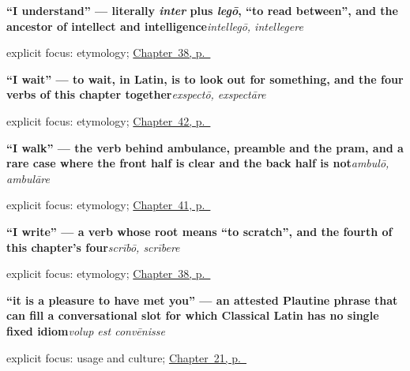 \noindent\begin{minipage}[t]{\linewidth}
\raggedright
\textbf{\textquotedblleft{}I understand\textquotedblright{} — literally \emph{inter} plus \emph{legō}, \textquotedblleft{}to read between\textquotedblright{}, and the ancestor of intellect and intelligence}\enspace\emph{intellegō, intellegere}\par
\footnotesize explicit focus: etymology; \hyperref[ch:la-mind-verbs]{Chapter~38, p.~\pageref*{ch:la-mind-verbs}}
\end{minipage}\par\smallskip

\noindent\begin{minipage}[t]{\linewidth}
\raggedright
\textbf{\textquotedblleft{}I wait\textquotedblright{} — to wait, in Latin, is to look out for something, and the four verbs of this chapter together}\enspace\emph{exspectō, exspectāre}\par
\footnotesize explicit focus: etymology; \hyperref[ch:la-getting-and-waiting-verbs]{Chapter~42, p.~\pageref*{ch:la-getting-and-waiting-verbs}}
\end{minipage}\par\smallskip

\noindent\begin{minipage}[t]{\linewidth}
\raggedright
\textbf{\textquotedblleft{}I walk\textquotedblright{} — the verb behind ambulance, preamble and the pram, and a rare case where the front half is clear and the back half is not}\enspace\emph{ambulō, ambulāre}\par
\footnotesize explicit focus: etymology; \hyperref[ch:la-motion-verbs]{Chapter~41, p.~\pageref*{ch:la-motion-verbs}}
\end{minipage}\par\smallskip

\noindent\begin{minipage}[t]{\linewidth}
\raggedright
\textbf{\textquotedblleft{}I write\textquotedblright{} — a verb whose root means \textquotedblleft{}to scratch\textquotedblright{}, and the fourth of this chapter's four}\enspace\emph{scrībō, scrībere}\par
\footnotesize explicit focus: etymology; \hyperref[ch:la-mind-verbs]{Chapter~38, p.~\pageref*{ch:la-mind-verbs}}
\end{minipage}\par\smallskip

\noindent\begin{minipage}[t]{\linewidth}
\raggedright
\textbf{\textquotedblleft{}it is a pleasure to have met you\textquotedblright{} — an attested Plautine phrase that can fill a conversational slot for which Classical Latin has no single fixed idiom}\enspace\emph{volup est convēnisse}\par
\footnotesize explicit focus: usage and culture; \hyperref[ch:la-nice-to-meet-you]{Chapter~21, p.~\pageref*{ch:la-nice-to-meet-you}}
\end{minipage}\par\smallskip

